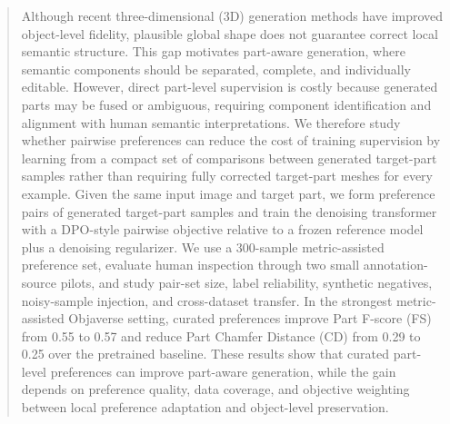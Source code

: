 \documentclass[10pt,twocolumn,letterpaper]{article}
\begin{document}
\begin{abstract}
Although recent three-dimensional (3D) generation methods have improved object-level fidelity, plausible global shape does not guarantee correct local semantic structure. This gap motivates part-aware generation, where semantic components should be separated, complete, and individually editable. However, direct part-level supervision is costly because generated parts may be fused or ambiguous, requiring component identification and alignment with human semantic interpretations.
We therefore study whether pairwise preferences can reduce the cost of training supervision by learning from a compact set of comparisons between generated target-part samples rather than requiring fully corrected target-part meshes for every example.
Given the same input image and target part, we form preference pairs of generated target-part samples and train the denoising transformer with a DPO-style pairwise objective relative to a frozen reference model plus a denoising regularizer. We use a 300-sample metric-assisted preference set, evaluate human inspection through two small annotation-source pilots, and study pair-set size, label reliability, synthetic negatives, noisy-sample injection, and cross-dataset transfer. In the strongest metric-assisted Objaverse setting, curated preferences improve Part F-score (FS) from 0.55 to 0.57 and reduce Part Chamfer Distance (CD) from 0.29 to 0.25 over the pretrained baseline. These results show that curated part-level preferences can improve part-aware generation, while the gain depends on preference quality, data coverage, and objective weighting between local preference adaptation and object-level preservation.
\end{abstract}
\end{document}
